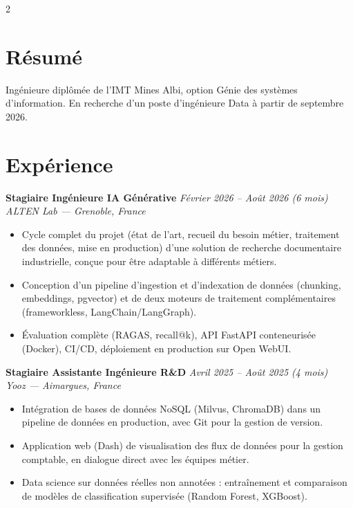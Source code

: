 \documentclass[10.5pt,a4paper]{article}
\newcommand{\sectionrule}{\vspace{-6pt}{\color{accent}\hrule height 1pt}\vspace{3pt}}
\newcommand{\cvexp}[5]{%
  \noindent\textbf{#1} \hfill {\itshape\color{graytext}\small #4}\\
  {\itshape #2 --- #3}\\[-2pt]
  #5
  \vspace{10pt}
}
\begin{document}
\setlength{\columnsep}{1.5em}
\begin{paracol}{2}

\section*{Résumé}
\sectionrule
\justifying
Ingénieure diplômée de l'IMT Mines Albi, option Génie des systèmes d'information. En recherche d'un poste d'ingénieure Data à partir de septembre 2026.

\section*{Expérience}
\sectionrule

\cvexp{Stagiaire Ingénieure IA Générative}{ALTEN Lab}{Grenoble, France}{Février 2026 -- Août 2026 (6 mois)}{%
  \begin{itemize}[leftmargin=12pt, itemsep=2pt, topsep=0pt, partopsep=0pt, parsep=0pt]
    \item Cycle complet du projet (état de l'art, recueil du besoin métier, traitement des données, mise en production) d'une solution de recherche documentaire industrielle, conçue pour être adaptable à différents métiers.
    \item Conception d'un pipeline d'ingestion et d'indexation de données (chunking, embeddings, pgvector) et de deux moteurs de traitement complémentaires (frameworkless, LangChain/\allowbreak LangGraph).
    \item Évaluation complète (RAGAS, recall@k), API FastAPI conteneurisée (Docker), CI/CD, déploiement en production sur Open WebUI.
  \end{itemize}
}

\cvexp{Stagiaire Assistante Ingénieure R\&D}{Yooz}{Aimargues, France}{Avril 2025 -- Août 2025 (4 mois)}{%
  \begin{itemize}[leftmargin=12pt, itemsep=2pt, topsep=0pt, partopsep=0pt, parsep=0pt]
    \item Intégration de bases de données NoSQL (Milvus, ChromaDB) dans un pipeline de données en production, avec Git pour la gestion de version.
    \item Application web (Dash) de visualisation des flux de données pour la gestion comptable, en dialogue direct avec les équipes métier.
    \item Data science sur données réelles non annotées : entraînement et comparaison de modèles de classification supervisée (Random Forest, XGBoost).
  \end{itemize}
}


\end{paracol}
\end{document}
